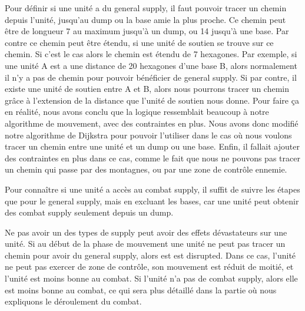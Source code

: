 Pour définir si une unité a du general supply, il faut pouvoir tracer un chemin depuis l'unité, jusqu'au dump ou la
base amie la plus proche. Ce chemin peut être de longueur 7 au maximum jusqu'à un dump, ou 14 jusqu'à une base. Par
contre ce chemin peut être étendu, si une unité de soutien se trouve sur ce chemin. Si c'est le cas alors le chemin est
étendu de 7 hexagones. Par exemple, si une unité A est a une distance de 20 hexagones d'une base B, alors normalement
il n'y a pas de chemin pour pouvoir bénéficier de general supply. Si par contre, il existe une unité de soutien entre
A et B, alors nous pourrons tracer un chemin grâce à l'extension de la distance que l'unité de soutien nous donne.
Pour faire ça en réalité, nous avons conclu que la logique ressemblait beaucoup à notre algorithme de mouvement,
avec des contraintes en plus. Nous avons donc modifié notre algorithme de Dijkstra pour pouvoir l'utiliser dans
le cas où nous voulons tracer un chemin entre une unité et un dump ou une base. Enfin, il fallait ajouter des
contraintes en plus dans ce cas, comme le fait que nous ne pouvons pas tracer un chemin qui passe par des montagnes,
ou par une zone de contrôle ennemie.

Pour connaître si une unité a accès au combat supply, il suffit de suivre les étapes que pour le general supply,
mais en excluant les bases, car une unité peut obtenir des combat supply seulement depuis un dump.

Ne pas avoir un des types de supply peut avoir des effets dévastateurs sur une unité. Si au début de la phase de
mouvement une unité ne peut pas tracer un chemin pour avoir du general supply, alors est est disrupted.
Dans ce cas, l'unité ne peut pas exercer de zone de contrôle, son mouvement est réduit de moitié, et l'unité est
moins bonne au combat. Si l'unité n'a pas de combat supply, alors elle est moins bonne au combat, ce qui sera plus
détaillé dans la partie où nous expliquons le déroulement du combat.